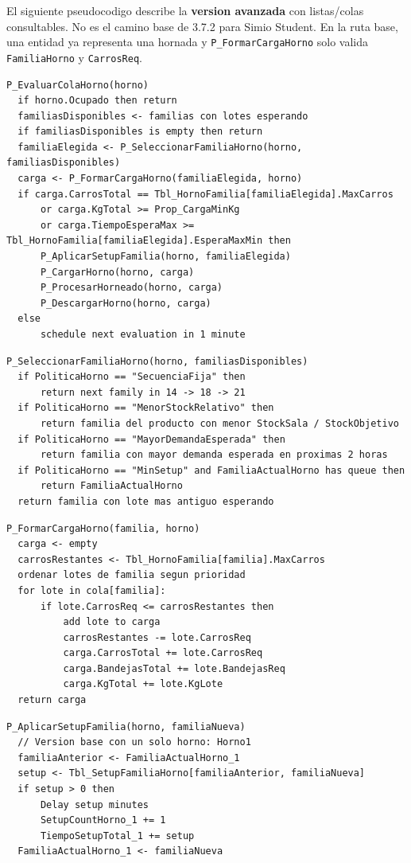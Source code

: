 \documentclass[11pt]{article}
\newcommand{\state}[1]{\texttt{#1}}
\newcommand{\proc}[1]{\texttt{#1}}
\begin{document}
El siguiente pseudocodigo describe la \textbf{version avanzada} con listas/colas consultables. No es el camino base de 3.7.2 para Simio Student. En la ruta base, una entidad ya representa una hornada y \proc{P\_FormarCargaHorno} solo valida \state{FamiliaHorno} y \state{CarrosReq}.

\begin{lstlisting}[caption={P EvaluarColaHorno}]
P_EvaluarColaHorno(horno)
  if horno.Ocupado then return
  familiasDisponibles <- familias con lotes esperando
  if familiasDisponibles is empty then return
  familiaElegida <- P_SeleccionarFamiliaHorno(horno, familiasDisponibles)
  carga <- P_FormarCargaHorno(familiaElegida, horno)
  if carga.CarrosTotal == Tbl_HornoFamilia[familiaElegida].MaxCarros
      or carga.KgTotal >= Prop_CargaMinKg
      or carga.TiempoEsperaMax >= Tbl_HornoFamilia[familiaElegida].EsperaMaxMin then
      P_AplicarSetupFamilia(horno, familiaElegida)
      P_CargarHorno(horno, carga)
      P_ProcesarHorneado(horno, carga)
      P_DescargarHorno(horno, carga)
  else
      schedule next evaluation in 1 minute
\end{lstlisting}

\begin{lstlisting}[caption={P SeleccionarFamiliaHorno}]
P_SeleccionarFamiliaHorno(horno, familiasDisponibles)
  if PoliticaHorno == "SecuenciaFija" then
      return next family in 14 -> 18 -> 21
  if PoliticaHorno == "MenorStockRelativo" then
      return familia del producto con menor StockSala / StockObjetivo
  if PoliticaHorno == "MayorDemandaEsperada" then
      return familia con mayor demanda esperada en proximas 2 horas
  if PoliticaHorno == "MinSetup" and FamiliaActualHorno has queue then
      return FamiliaActualHorno
  return familia con lote mas antiguo esperando
\end{lstlisting}

\begin{lstlisting}[caption={P FormarCargaHorno}]
P_FormarCargaHorno(familia, horno)
  carga <- empty
  carrosRestantes <- Tbl_HornoFamilia[familia].MaxCarros
  ordenar lotes de familia segun prioridad
  for lote in cola[familia]:
      if lote.CarrosReq <= carrosRestantes then
          add lote to carga
          carrosRestantes -= lote.CarrosReq
          carga.CarrosTotal += lote.CarrosReq
          carga.BandejasTotal += lote.BandejasReq
          carga.KgTotal += lote.KgLote
  return carga
\end{lstlisting}

\begin{lstlisting}[caption={P AplicarSetupFamilia}]
P_AplicarSetupFamilia(horno, familiaNueva)
  // Version base con un solo horno: Horno1
  familiaAnterior <- FamiliaActualHorno_1
  setup <- Tbl_SetupFamiliaHorno[familiaAnterior, familiaNueva]
  if setup > 0 then
      Delay setup minutes
      SetupCountHorno_1 += 1
      TiempoSetupTotal_1 += setup
  FamiliaActualHorno_1 <- familiaNueva
\end{lstlisting}
\end{document}
